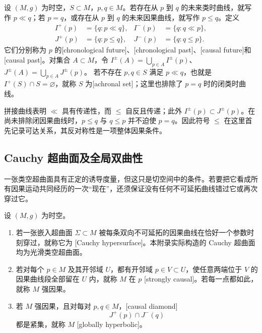 \begin{definition}\label{g3:def:A-chronological-causal-futures}
	设 \((M,g)\) 为时空，\(S\subset M\)，\(p,q\in M\)。若存在从 \(p\) 到 \(q\) 的未来类时曲线，就写作 \(p\ll q\)；若 \(p=q\)，或存在从 \(p\) 到 \(q\) 的未来因果曲线，就写作 \(p\le q\)。定义
	\[
	\begin{aligned}
		I^+(p)&=\{q:p\ll q\},& I^-(p)&=\{q:q\ll p\},\\
		J^+(p)&=\{q:p\le q\},& J^-(p)&=\{q:q\le p\}.
	\end{aligned}
	\]
	它们分别称为 \(p\) 的[chronological future]、[chronological past]、[causal future]和[causal past]。对集合 \(A\subset M\)，令 \(I^\pm(A)=\bigcup_{p\in A}I^\pm(p)\)、\(J^\pm(A)=\bigcup_{p\in A}J^\pm(p)\)。
	若不存在 \(p,q\in S\) 满足 \(p\ll q\)，也就是 \(I^+(S)\cap S=\varnothing\)，就称 \(S\) 为[achronal set]；这里也排除了 \(p=q\) 时的闭类时曲线。
\end{definition}

拼接曲线表明 \(\ll\) 具有传递性，而 \(\le\) 自反且传递；此外 \(I^\pm(p)\subset J^\pm(p)\)。在尚未排除闭因果曲线时，\(p\le q\) 与 \(q\le p\) 并不迫使 \(p=q\)。因此符号 \(\le\) 在这里首先记录可达关系，其反对称性是一项整体因果条件。

\subsection{Cauchy 超曲面及全局双曲性}
\label{g3:subsec:A02:02}

一张类空超曲面具有正定的诱导度量，但这只是切空间中的条件。若要把它看成所有因果运动共同经历的一次“现在”，还须保证没有任何不可延拓曲线错过它或再次穿过它。

\begin{definition}\label{g3:def:A-cauchy-global-hyperbolic}
	设 \((M,g)\) 为时空。
	\begin{enumerate}
		\item 若一张嵌入超曲面 \(\Sigma\subset M\) 被每条双向不可延拓的因果曲线在恰好一个参数时刻穿过，就称它为 [Cauchy hypersurface]。本附录实际构造的 Cauchy 超曲面均为光滑类空超曲面。
		\item 若对每个 \(p\in M\) 及其开邻域 \(U\)，都有开邻域 \(p\in V\subset U\)，使任意两端位于 \(V\) 的因果曲线段全部留在 \(U\) 内，就称 \(M\) 在 \(p\) [strongly causal]。若每一点都如此，就称 \(M\) 强因果。
		\item 若 \(M\) 强因果，且对每对 \(p,q\in M\)，[causal diamond]
		\[
			J^+(p)\cap J^-(q)
		\]
		都是紧集，就称 \(M\) [globally hyperbolic]。
	\end{enumerate}
\end{definition}

